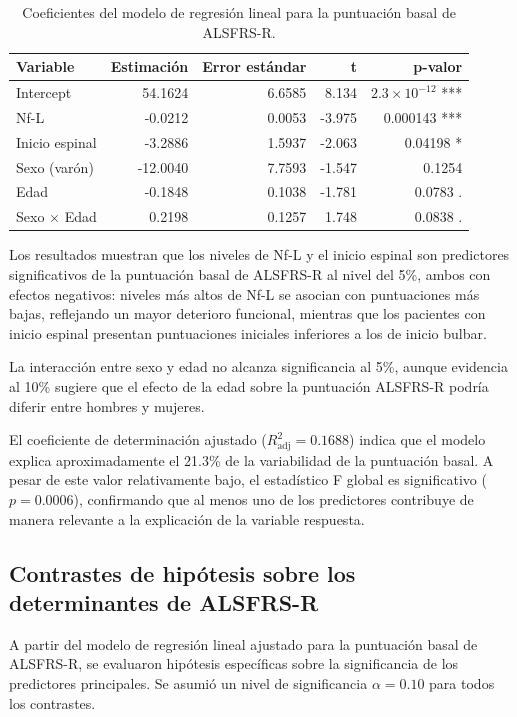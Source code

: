 \documentclass[12pt]{article} %
\begin{document}
\begin{table}[h!]
\centering
\caption{Coeficientes del modelo de regresión lineal para la puntuación basal de ALSFRS-R.}
\label{tab:lm_ALSFRSR}
\begin{tabular}{lrrrr}
\hline
\textbf{Variable} & \textbf{Estimación} & \textbf{Error estándar} & \textbf{t} & \textbf{p-valor} \\
\hline
Intercept      & 54.1624 & 6.6585 & 8.134  & $2.3 \times 10^{-12}$ *** \\
Nf-L           & -0.0212 & 0.0053 & -3.975 & 0.000143 *** \\
Inicio espinal & -3.2886 & 1.5937 & -2.063 & 0.04198 * \\
Sexo (varón)   & -12.0040 & 7.7593 & -1.547 & 0.1254 \\
Edad           & -0.1848 & 0.1038 & -1.781 & 0.0783 . \\
Sexo $\times$ Edad & 0.2198 & 0.1257 & 1.748 & 0.0838 . \\
\hline
\end{tabular}
\end{table}

Los resultados muestran que los niveles de Nf-L y el inicio espinal son predictores significativos de la puntuación basal de ALSFRS-R al nivel del 5\%, ambos con efectos negativos: niveles más altos de Nf-L se asocian con puntuaciones más bajas, reflejando un mayor deterioro funcional, mientras que los pacientes con inicio espinal presentan puntuaciones iniciales inferiores a los de inicio bulbar.

La interacción entre sexo y edad no alcanza significancia al 5\%, aunque evidencia al 10\% sugiere que el efecto de la edad sobre la puntuación ALSFRS-R podría diferir entre hombres y mujeres.

El coeficiente de determinación ajustado ($R^2_\text{adj} = 0.1688$) indica que el modelo explica aproximadamente el 21.3\% de la variabilidad de la puntuación basal. A pesar de este valor relativamente bajo, el estadístico F global es significativo ($p = 0.0006$), confirmando que al menos uno de los predictores contribuye de manera relevante a la explicación de la variable respuesta.

\subsection{Contrastes de hipótesis sobre los determinantes de ALSFRS-R}

A partir del modelo de regresión lineal ajustado para la puntuación basal de ALSFRS-R, se evaluaron hipótesis específicas sobre la significancia de los predictores principales. Se asumió un nivel de significancia $\alpha = 0.10$ para todos los contrastes.
\end{document}
